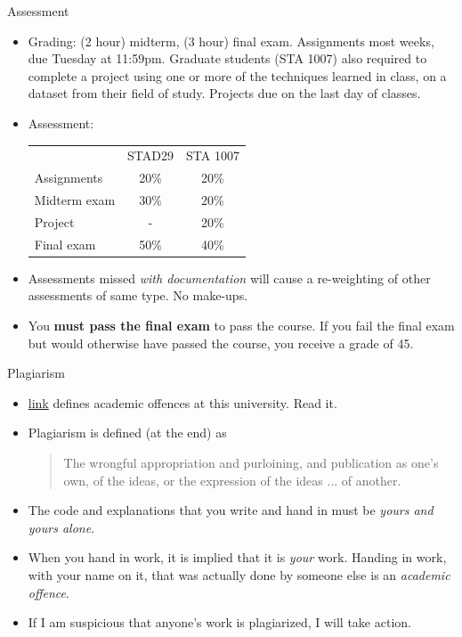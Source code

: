 \documentclass[ignorenonframetext,]{beamer}
\begin{document}
\begin{frame}{Assessment}
\protect\hypertarget{assessment}{}

\begin{itemize}
\item
  Grading: (2 hour) midterm, (3 hour) final exam. Assignments most
  weeks, due Tuesday at 11:59pm. Graduate students (STA 1007) also
  required to complete a project using one or more of the techniques
  learned in class, on a dataset from their field of study. Projects due
  on the last day of classes.
\item
  Assessment:

  \begin{tabular}{lcc}
  & STAD29 & STA 1007\\
  Assignments & 20\% & 20\%\\
  Midterm exam & 30\%  & 20\% \\
  Project & - & 20\%\\
  Final exam & 50\% & 40\%
  \end{tabular}
\item
  Assessments missed \emph{with documentation} will cause a re-weighting
  of other assessments of same type. No make-ups.
\item
  You \textbf{must pass the final exam} to pass the course. If you fail
  the final exam but would otherwise have passed the course, you receive
  a grade of 45.
\end{itemize}

\end{frame}

\begin{frame}{Plagiarism}
\protect\hypertarget{plagiarism}{}

\begin{itemize}
\item
  \href{http://www.utoronto.ca/academicintegrity/academicoffenses.html}{link}
  defines academic offences at this university. Read it.
\item
  Plagiarism is defined (at the end) as

  \begin{quote}
  The wrongful appropriation and purloining, and publication as one’s own, of the ideas, or the expression of the ideas ... of another.
  \end{quote}
\item
  The code and explanations that you write and hand in must be
  \emph{yours and yours
  alone}.
\item
  When you hand in work, it is implied that it is \emph{your} work.
  Handing in work, with your name on it, that was actually done by
  someone else is an \emph{academic offence}.
\item
  If I am suspicious that anyone's work is plagiarized, I will take
  action.
\end{itemize}

\end{frame}
\end{document}
